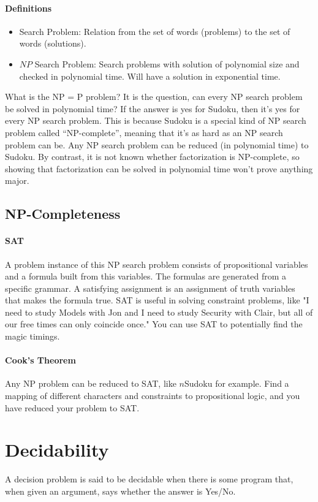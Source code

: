 \paragraph{Definitions}
\begin{itemize}
	\item Search Problem: Relation from the set of words (problems) to the set of words (solutions).
	\item $NP$ Search Problem: Search problems with solution of polynomial size and checked in polynomial time. Will have a solution in exponential time.
\end{itemize}
What is the NP = P problem? It is the question, can every NP search problem be solved in polynomial time?  If  the  answer is  yes  for Sudoku,  then  it’s yes  for every NP search problem.  This is because Sudoku is a special kind of NP search problem called “NP-complete”, meaning that it’s as hard as an NP search problem can be. Any NP search problem can be reduced (in polynomial time) to Sudoku. By contrast, it is not known whether factorization is NP-complete, so showing that factorization can be solved in polynomial time won’t prove anything major.
\subsection{NP-Completeness}
\paragraph{SAT} A problem instance of this NP search problem consists of propositional variables and a formula built from this variables. The formulas are generated from a specific grammar. A satisfying assignment is an assignment of truth variables that makes the formula true. SAT is useful in solving constraint problems, like "I need to study Models with Jon and I need to study Security with Clair, but all of our free times can only coincide once." You can use SAT to potentially find the magic timings.
\paragraph{Cook's Theorem} Any NP problem can be reduced to SAT, like $n$Sudoku for example. Find a mapping of different characters and constraints to propositional logic, and you have reduced your problem to SAT.
\section{Decidability}
A decision problem is said to be decidable when there is some program that, when given an argument, says whether the answer is Yes/No.
